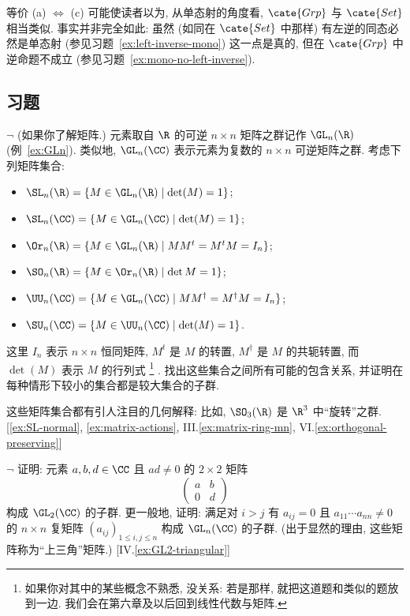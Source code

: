 等价 (a) $\Longleftrightarrow$ (c) 可能使读者以为, 从单态射的角度看, $\cate{Grp}$ 与 $\cate{Set}$ 相当类似. 事实并非完全如此: 虽然 (如同在 $\cate{Set}$ 中那样) 有左逆的同态必然是单态射 (参见习题~\ref{ex:left-inverse-mono}) 这一点是真的, 但在 $\cate{Grp}$ 中逆命题不成立 (参见习题~\ref{ex:mono-no-left-inverse}).

\subsection*{习题}
{}

\begin{prob}
\label{ex:matrix-subgroups}
$\neg$ (如果你了解矩阵.) 元素取自 $\R$ 的可逆 $n \times n$ 矩阵之群记作 $\GL_n(\R)$ (例~\ref{ex:GLn}). 类似地, $\GL_n(\CC)$ 表示元素为复数的 $n \times n$ 可逆矩阵之群. 考虑下列矩阵集合:
\begin{itemize}
	\item $\SL_n(\R) = \{M \in \GL_n(\R) \mid \det(M) = 1\}$;
	\item $\SL_n(\CC) = \{M \in \GL_n(\CC) \mid \det(M) = 1\}$;
	\item $\Or_n(\R) = \{M \in \GL_n(\R) \mid MM^t = M^t M = I_n\}$;
	\item $\SO_n(\R) = \{M \in \Or_n(\R) \mid \det M = 1\}$;
	\item $\UU_n(\CC) = \{M \in \GL_n(\CC) \mid MM^{\dagger} = M^{\dagger} M = I_n\}$;
	\item $\SU_n(\CC) = \{M \in \UU_n(\CC) \mid \det(M) = 1\}$.
\end{itemize}
这里 $I_n$ 表示 $n \times n$ 恒同矩阵, $M^t$ 是 $M$ 的转置, $M^{\dagger}$ 是 $M$ 的共轭转置, 而 $\det(M)$ 表示 $M$ 的行列式%
\footnote{如果你对其中的某些概念不熟悉, 没关系: 若是那样, 就把这道题和类似的题放到一边. 我们会在第六章及以后回到线性代数与矩阵.}%
. 找出这些集合之间所有可能的包含关系, 并证明在每种情形下较小的集合都是较大集合的子群.

这些矩阵集合都有引人注目的几何解释: 比如, $\SO_3(\R)$ 是 $\R^3$ 中``旋转''之群. [\ref{ex:SL-normal}, \ref{ex:matrix-actions}, III.\ref{ex:matrix-ring-mn}, VI.\ref{ex:orthogonal-preserving}]
\end{prob}

\begin{prob}
\label{ex:upper-triangular}
$\neg$ 证明: 元素 $a, b, d \in \CC$ 且 $ad \neq 0$ 的 $2 \times 2$ 矩阵
\[
\begin{pmatrix} a & b \\ 0 & d \end{pmatrix}
\]
构成 $\GL_2(\CC)$ 的子群. 更一般地, 证明: 满足对 $i > j$ 有 $a_{ij} = 0$ 且 $a_{11} \cdots a_{nn} \neq 0$ 的 $n \times n$ 复矩阵 $(a_{ij})_{1 \leq i,j \leq n}$ 构成 $\GL_n(\CC)$ 的子群. (出于显然的理由, 这些矩阵称为``上三角''矩阵.) [IV.\ref{ex:GL2-triangular}]
\end{prob}

